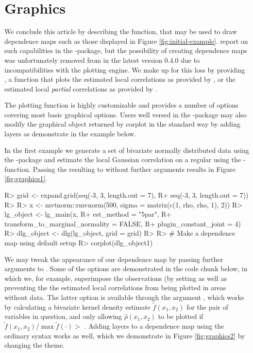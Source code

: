 \section{Graphics}\label{chap:graphics}

We conclude this article by describing the  function, that may be used to draw dependence maps such as those displayed in Figure \ref{fig:initial-example}. \citet{bere:klep:tjos:2014} report on such capabilities in the -package, but the possibility of creating dependence maps was unfortunately removed from  in the latest version 0.4.0 due to incompatibilities with the  \citep{wick:2016} plotting engine. We make up for this loss by providing , a function that plots the estimated local correlations as provided by , or the estimated local \emph{partial} correlations as provided by .

The plotting function is highly customizable and provides a number of options covering most basic graphical options. Users well versed in the -package may also modify the graphical object returned by corplot in the standard way by adding layers as demonstrate in the example below.

In the first example we generate a set of bivariate normally distributed data using the -package \citep{gentz:etal:2018} and estimate the local Gaussian correlation on a regular  using the -function. Passing the resulting  to  without further arguments results in Figure \ref{fig:graphics1}.

\begin{example}
R> grid <- expand.grid(seq(-3, 3, length.out = 7),
R+                     seq(-3, 3, length.out = 7))
R> 
R> x <- mvtnorm::rmvnorm(500, sigma = matrix(c(1, rho, rho, 1), 2))
R> lg_object <- lg_main(x, 
R+                      est_method = "5par", 
R+                      transform_to_marginal_normality = FALSE,
R+                      plugin_constant_joint = 4)
R> dlg_object <- dlg(lg_object, grid = grid)
R> 
R> # Make a dependence map using default setup
R> corplot(dlg_object1)
\end{example}


We may tweak the appearance of our dependence map by passing further arguments to . Some of the options are demonstrated in the code chunk below, in which we, for example, superimpose the observations (by setting  as well as preventing the the estimated local correlations from being plotted in areas without data. The latter option is available through the argument , which works by calculating a bivariate kernel density estimate \(\tilde f(x_1, x_2)\) for the pair of  variables in question, and only allowing \(\widehat \rho(x_1,x_2)\) to be plotted if \(\tilde f(x_1,x_2)/\max\tilde f(\cdot) >\) . Adding layers to a dependence map using the ordinary  syntax works as well, which we demonstrate in Figure \ref{fig:graphics2} by changing the  theme.

